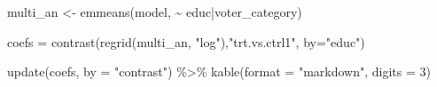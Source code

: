 \documentclass[
  letterpaper,
  DIV=11,
  numbers=noendperiod]{scrartcl}
\newenvironment{Shaded}{\begin{snugshade}}{\end{snugshade}}
\newcommand{\AttributeTok}[1]{\textcolor[rgb]{0.40,0.45,0.13}{#1}}
\newcommand{\DecValTok}[1]{\textcolor[rgb]{0.68,0.00,0.00}{#1}}
\newcommand{\FunctionTok}[1]{\textcolor[rgb]{0.28,0.35,0.67}{#1}}
\newcommand{\NormalTok}[1]{\textcolor[rgb]{0.00,0.23,0.31}{#1}}
\newcommand{\OtherTok}[1]{\textcolor[rgb]{0.00,0.23,0.31}{#1}}
\newcommand{\SpecialCharTok}[1]{\textcolor[rgb]{0.37,0.37,0.37}{#1}}
\newcommand{\StringTok}[1]{\textcolor[rgb]{0.13,0.47,0.30}{#1}}
\begin{document}
\begin{Shaded}
\begin{Highlighting}[]
\NormalTok{multi\_an }\OtherTok{\textless{}{-}} \FunctionTok{emmeans}\NormalTok{(model, }\SpecialCharTok{\textasciitilde{}}\NormalTok{ educ}\SpecialCharTok{|}\NormalTok{voter\_category)}

\NormalTok{coefs }\OtherTok{=} \FunctionTok{contrast}\NormalTok{(}\FunctionTok{regrid}\NormalTok{(multi\_an, }\StringTok{"log"}\NormalTok{),}\StringTok{"trt.vs.ctrl1"}\NormalTok{,  }\AttributeTok{by=}\StringTok{"educ"}\NormalTok{)}

\FunctionTok{update}\NormalTok{(coefs, }\AttributeTok{by =} \StringTok{"contrast"}\NormalTok{) }\SpecialCharTok{\%\textgreater{}\%} 
  \FunctionTok{kable}\NormalTok{(}\AttributeTok{format =} \StringTok{"markdown"}\NormalTok{, }\AttributeTok{digits =} \DecValTok{3}\NormalTok{)}
\end{Highlighting}
\end{Shaded}
\end{document}
